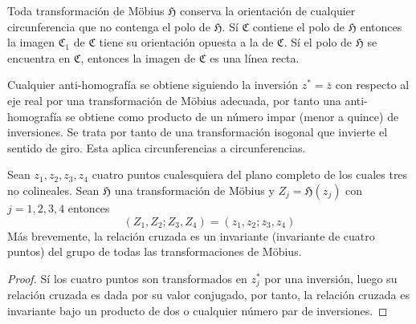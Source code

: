 \documentclass{matematicasud}
\begin{document}
\begin{teorema}
    Toda transformación de Möbius $\mathfrak{H}$ conserva la orientación de cualquier circunferencia que no contenga el polo de $\mathfrak{H}$. Sí $\mathfrak{C}$ contiene el polo de $\mathfrak{H}$ entonces la imagen $\mathfrak{C}_1$ de $\mathfrak{C}$ tiene su orientación opuesta a la de $\mathfrak{C}$. Sí el polo de $\mathfrak{H}$ se encuentra en $\mathfrak{C}$, entonces la imagen de $\mathfrak{C}$ es una línea recta.
\end{teorema}
Cualquier anti-homografía se obtiene siguiendo la inversión $z^*=\bar{z}$ con respecto al eje real por una transformación de Möbius adecuada, por tanto una anti-homografía se obtiene como producto de un número impar (menor a quince) de inversiones. Se trata por tanto de una transformación isogonal que invierte el sentido de giro. Esta aplica circunferencias a circunferencias.
\begin{teorema}
    Sean $z_1,z_2,z_3,z_4$ cuatro puntos cualesquiera del plano completo de los cuales tres no colineales. Sean $\mathfrak{H}$ una transformación de Möbius y $Z_j=\mathfrak{H}(z_j)$ con $j=1,2,3,4$ entonces
    \begin{equation*}
        (Z_1,Z_2;Z_3,Z_4)=(z_1,z_2;z_3,z_4)
    \end{equation*}
    Más brevemente, la relación cruzada es un invariante (invariante de cuatro puntos) del grupo de todas las transformaciones de Möbius.
\end{teorema}
\begin{proof}
    Sí los cuatro puntos son transformados en $z_j^*$ por una inversión, luego su relación cruzada es dada por su valor conjugado, por tanto, la relación cruzada es invariante bajo un producto de dos o cualquier número par de inversiones.
\end{proof}
\end{document}

